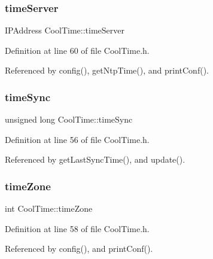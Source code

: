 \subsubsection{\texorpdfstring{time\+Server}{timeServer}}
{\footnotesize\ttfamily I\+P\+Address Cool\+Time\+::time\+Server\hspace{0.3cm}{\ttfamily [private]}}



Definition at line 60 of file Cool\+Time.\+h.



Referenced by config(), get\+Ntp\+Time(), and print\+Conf().

\mbox{\label{classCoolTime_a9d032e76c3470a15b3bbbc52af6463f7}} 
\subsubsection{\texorpdfstring{time\+Sync}{timeSync}}
{\footnotesize\ttfamily unsigned long Cool\+Time\+::time\+Sync\hspace{0.3cm}{\ttfamily [private]}}



Definition at line 56 of file Cool\+Time.\+h.



Referenced by get\+Last\+Sync\+Time(), and update().

\mbox{\label{classCoolTime_a1916d98810c2a4e9ba72867e8c1b9a99}} 
\subsubsection{\texorpdfstring{time\+Zone}{timeZone}}
{\footnotesize\ttfamily int Cool\+Time\+::time\+Zone\hspace{0.3cm}{\ttfamily [private]}}



Definition at line 58 of file Cool\+Time.\+h.



Referenced by config(), and print\+Conf().

\mbox{\label{classCoolTime_a4e23216a8121ca79d0fb019f30884b92}} 
